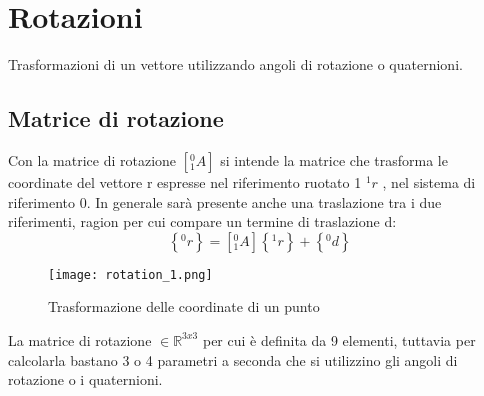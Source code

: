 %
%
%

\chapter{Rotazioni}
\label{Rotazioni} %

Trasformazioni di un vettore utilizzando angoli di rotazione o quaternioni.
\section{Matrice di rotazione}
Con la matrice di rotazione $[_1^0A]$ si intende la matrice che trasforma le coordinate del vettore r espresse nel riferimento ruotato 1 ${^1r}$ , nel sistema di riferimento 0. \newline In generale sarà presente anche una traslazione tra i due riferimenti, ragion per cui compare un termine di traslazione d:
\begin{equation}
\label{eq:1.1}
\left\{^0r\right\} = \left[_1^0A\right]\left\{^1r\right\} + \left\{^0d\right\}
\end{equation}

\begin{figure}[h!]
\centering
\texttt{[image: rotation\_1.png]}
\caption{Trasformazione delle coordinate di un punto}
\label{fig:1.1}
\end{figure}
La matrice di rotazione $\in \mathbb{R}^{3x3}$ per cui è definita da 9 elementi, tuttavia per calcolarla bastano 3 o 4 parametri a seconda che si utilizzino gli angoli di rotazione o i quaternioni.
